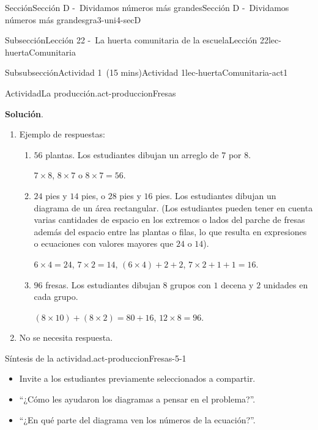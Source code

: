 \documentclass[oneside,10pt,]{article}
\newcommand{\blocktitlefont}{\relax}
\begin{document}
\begin{sectionptx}{Sección}{Sección D -~Dividamos números más grandes}{}{Sección D -~Dividamos números más grandes}{}{}{gra3-uni4-secD}
\begin{subsectionptx}{Subsección}{Lección 22 -~La huerta comunitaria de la escuela}{}{Lección 22}{}{}{lec-huertaComunitaria}
\begin{subsubsectionptx}{Subsubsección}{Actividad 1~(15 mins)}{}{Actividad 1}{}{}{lec-huertaComunitaria-act1}
\begin{activity}{Actividad}{La producción.}{act-produccionFresas}
\par\smallskip%
\noindent\textbf{\blocktitlefont Solución}.\hypertarget{act-produccionFresas-3}{}\quad{}%
\begin{enumerate}
\item{}Ejemplo de respuestas:%
%
\begin{enumerate}
\item{}\(56\) plantas. Los estudiantes dibujan un arreglo de \(7\) por \(8\).%
\par
\(7\times8\), \(8\times7\) o \(8\times7=56\).%
\item{}\(24\) pies y \(14\) pies, o \(28\) pies y \(16\) pies. Los estudiantes dibujan un diagrama de un área rectangular. (Los estudiantes pueden tener en cuenta varias cantidades de espacio en los extremos o lados del parche de fresas además del espacio entre las plantas o filas, lo que resulta en expresiones o ecuaciones con valores mayores que \(24\) o \(14\)).%
\par
\(6\times4=24\), \(7\times2=14\), \((6\times4)+2+2\), \(7\times2+1+1=16\).%
\item{}\(96\) fresas. Los estudiantes dibujan \(8\) grupos con \(1\) decena y \(2\) unidades en cada grupo.%
\par
\((8 \times 10) + (8 \times 2) = 80 + 16\), \(12\times8=96\).%
\end{enumerate}
\item{}No se necesita respuesta.%
\end{enumerate}
\end{activity}%
%
\par
\begin{paragraphs}{Síntesis de la actividad.}{act-produccionFresas-5-1}%
%
\begin{itemize}[label=\textbullet]
\item{}Invite a los estudiantes previamente seleccionados a compartir.%
\item{}``¿Cómo les ayudaron los diagramas a pensar en el problema?''.%
\item{}``¿En qué parte del diagrama ven los números de la ecuación?''.%
\end{itemize}
\end{paragraphs}%
\end{subsubsectionptx}
%
%
\typeout{************************************************}
\typeout{************************************************}

\end{subsectionptx}
\end{sectionptx}
\end{document}
